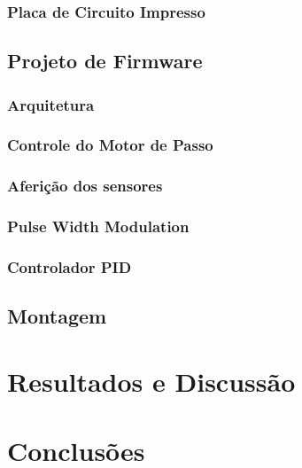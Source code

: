 \documentclass[12pt, english]{article}
\begin{document}
\subsubsection{Placa de Circuito Impresso}
\subsection{Projeto de Firmware}
\subsubsection{Arquitetura}
\subsubsection{Controle do Motor de Passo}
\subsubsection{Aferição dos sensores}
\subsubsection{Pulse Width Modulation}
\subsubsection{Controlador PID}

\subsection{Montagem}
	

\pagebreak
\section{Resultados e Discussão}

\pagebreak
\section{Conclusões}




\pagebreak

\printbibliography[title=Referências]
\end{document}
